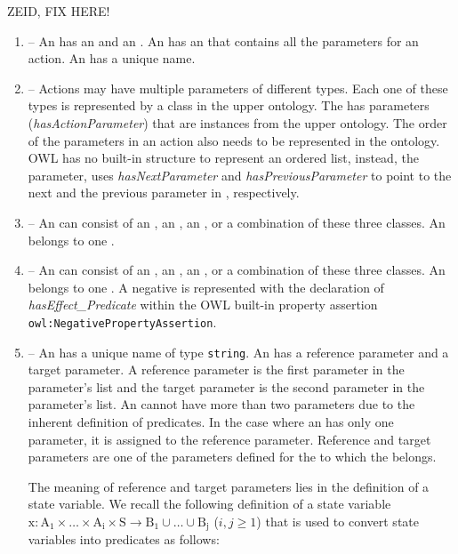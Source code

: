 ZEID, FIX HERE!

\begin{enumerate}
\item {} -- An  has an  and an . An  has an  that contains all the parameters for an action. An  has a unique name.
\item {} -- Actions may have multiple parameters of different types. Each one of these types is represented by a class in the upper ontology. The  has parameters (\emph{hasActionParameter}) that are instances from the upper ontology. The order of the parameters in an  action also needs to be represented in the ontology. OWL has no built-in structure to represent an ordered list, instead, the parameter, uses \emph{hasNextParameter} and \emph{hasPreviousParameter} to point to the next and the previous parameter in , respectively.
\item {} -- An  can consist of an , an , an , or a combination of these three classes. An  belongs to one .
\item {} -- An  can consist of an , an , an , or a combination of these three classes. An  belongs to one . A negative  is represented with the declaration of \emph{hasEffect\_Predicate} within the OWL built-in property assertion \texttt{owl:NegativePropertyAssertion}.
\item {} -- An  has a unique name of type \texttt{string}. An  has a reference parameter and a target parameter. A reference parameter is the first parameter in the parameter's list and the target parameter is the second parameter in the parameter's list. An  cannot have more than two parameters due to the inherent definition of predicates. In the case where an  has only one parameter, it is assigned to the reference parameter. Reference and target parameters are one of the parameters defined for the  to which the  belongs.


The meaning of reference and target parameters lies in the definition of a state variable. We recall the following definition of a state variable\\ $\mathrm{x: A_1\times \dots\times A_i\times S\rightarrow B_1\cup\dots\cup B_j}$ ($i, j\geq 1$) that is used to convert state variables into predicates as follows:


\end{enumerate}
